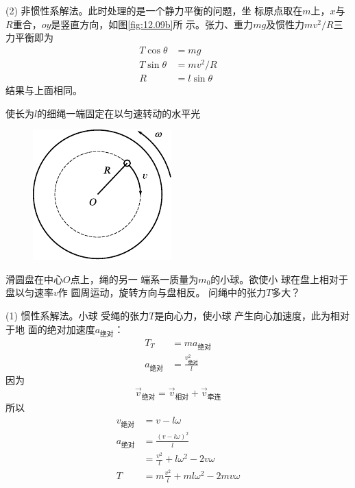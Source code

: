(2) 非惯性系解法。此时处理的是一个静力平衡的问题，坐
标原点取在$ m $上，$ x $与$ R $重合，$ oy $是竖直方向，如图\ref{fig:12.09b}所
示。张力、重力$ mg $及惯性力$ mv^2/R $三力平衡即为
\begin{align*}
    T \cos \theta &= m g \\
    T \sin \theta &= m v ^ { 2 } / R \\
    R &= l \sin \theta
\end{align*}
结果与上面相同。

\example 使长为$ l $的细绳一端固定在以匀速转动的水平光
\begin{figure}
    \centering
    \includegraphics{figure/fig12.10}
    \caption{}
    \label{fig:12.10}
\end{figure}
滑圆盘在中心$ O $点上，绳的另一
端系一质量为$ m_0 $的小球。欲使小
球在盘上相对于盘以匀速率$ v $作
圆周运动，旋转方向与盘相反。
问绳中的张力$ T $多大？

\solution (1) 惯性系解法。小球
受绳的张力$ T $是向心力，使小球
产生向心加速度，此为相对于地
面的绝对加速度$ a_\text{绝对} $：
\begin{align*}
    T _ { T } &= m a_\text{绝对} \\
    a_\text{绝对} &= \frac { v _\text{绝对} ^ { 2 } } { l }
\end{align*}
因为\vspace{-2em}
\begin{equation*}
    \vec{v}_\text{绝对} = \vec{v}_\text{相对} + \vec{v}_\text{牵连}
\end{equation*}
所以\vspace{-1.4em}
\begin{align*}
    v_\text{绝对} &= v - l \omega \\
    a_\text{绝对} &= \frac { \left( v - l \omega \right) ^ { 2 } } { l } \\
                 &= \frac { v ^ { 2 } } { l } + l \omega ^ { 2 } - 2 v \omega \\
            T &= m \frac { v ^ { 2 } } { l } + m l \omega ^ { 2 } - 2 m v \omega
\end{align*}

